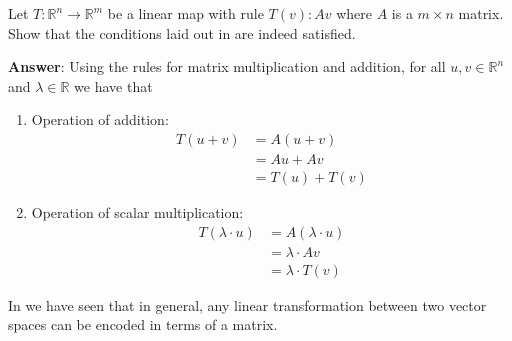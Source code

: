 \begin{exm}\label{exm-matrix-map}
	Let $T:\mathbb{R}^n\to\mathbb{R}^m$ be a linear map with rule $T(v):Av$
	where $A$ is a $m \times n$ matrix. Show that the conditions laid out in
	 are indeed satisfied.
	\begin{flushleft}
		\textbf{Answer}: Using the rules for matrix multiplication and addition,
		for all $u,v\in\mathbb{R}^n$ and $\lambda\in\mathbb{R}$ we have that
		\begin{enumerate}
			\item Operation of addition:
			      \begin{align*}
				      T(u+v) & = A(u+v)    \\
				             & = Au + Av   \\
				             & = T(u)+T(v)
			      \end{align*}
			\item Operation of scalar multiplication:
			      \begin{align*}
				      T(\lambda\cdot u) & = A(\lambda\cdot u) \\
				                        & = \lambda\cdot Av   \\
				                        & = \lambda\cdot T(v)
			      \end{align*}
		\end{enumerate}
	\end{flushleft}
\end{exm}

\begin{rem}
	In  we have seen that in general, any
	linear transformation between two vector spaces can be encoded in terms of a
	matrix.
\end{rem}

